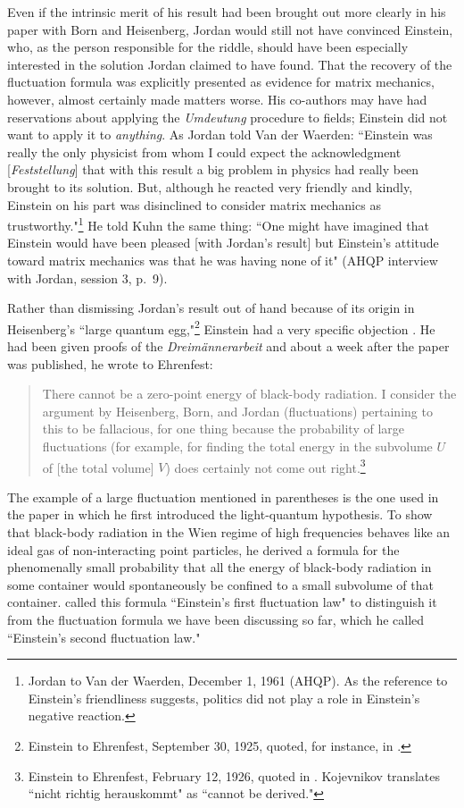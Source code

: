 \documentclass{elsart}
\begin{document}
Even if the intrinsic merit of his result had been brought out more clearly in his paper with Born and Heisenberg, Jordan would still not have convinced Einstein, who, as the person responsible for the riddle, should have been especially interested in the solution Jordan claimed to have found. That the recovery of the fluctuation formula was explicitly presented as evidence for matrix mechanics, however, almost certainly made matters worse. His co-authors may have had reservations about applying the {\it Umdeutung} procedure to fields; Einstein did not want to apply it to {\it anything}. As Jordan told Van der Waerden: ``Einstein was really the only physicist from whom I could expect the acknowledgment [{\it Feststellung}] that with this result a big problem in physics had really been brought to its solution. But, although he reacted very friendly and kindly, Einstein on his part was disinclined to consider matrix mechanics as trustworthy."\footnote{Jordan to Van der Waerden, December 1, 1961 (AHQP). As the reference to Einstein's friendliness suggests, politics did not play a role in Einstein's negative reaction.} He told Kuhn the same thing: ``One might have imagined that Einstein would have been pleased [with Jordan's result] but Einstein's attitude toward matrix mechanics was that he was having none of it"
(AHQP interview with Jordan, session 3, p.\ 9).

Rather than dismissing Jordan's result out of hand because of its origin in Heisenberg's ``large quantum egg,"\footnote{Einstein to Ehrenfest, September 30, 1925, quoted, for instance, in \citep[p.\ 566]{Foelsing 1997}.} Einstein had a very specific objection \citep[p.\ 222]{Darrigol 1986}. 
He had been given proofs of the {\it Dreim\"annerarbeit} and about a week after the paper was published, he wrote to Ehrenfest: 
\begin{quotation}
There cannot be a zero-point energy of black-body radiation. I consider the argument by Heisenberg, Born, and Jordan (fluctuations) pertaining to this to be fallacious, for one thing because the probability of large fluctuations (for example, for finding the total energy in the subvolume $U$ of [the total volume] $V$) does certainly not come out right.\footnote{Einstein to Ehrenfest, February 12, 1926, quoted in \citep[p.\ 212]{Kojevnikov 1990}. Kojevnikov translates ``nicht richtig herauskommt" as ``cannot be derived."} 
\end{quotation}
The example of a large fluctuation mentioned in parentheses is the one \citet{Einstein 1905} used in the paper in which he first introduced the light-quantum hypothesis. To show that  black-body radiation in the Wien regime of high frequencies behaves like an ideal gas of non-interacting point particles, he derived a formula for the phenomenally small probability that all the energy of black-body radiation in some container would spontaneously be confined to a small subvolume of that container. \citet[pp.\ 161--162]{Jordan 1928} called this formula ``Einstein's first fluctuation law" to distinguish it from the fluctuation formula we have been discussing so far, which he called ``Einstein's second fluctuation law." 
\end{document}

